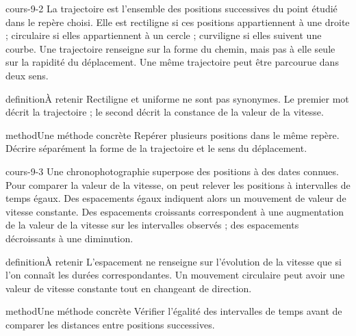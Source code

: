 \documentclass[12pt,twoside,openany]{book}
\begin{document}
\begin{pcFiche}{cours-9-2}
La trajectoire est l’ensemble des positions successives du point étudié dans le repère choisi. Elle est rectiligne si ces positions appartiennent à une droite ; circulaire si elles appartiennent à un cercle ; curviligne si elles suivent une courbe. Une trajectoire renseigne sur la forme du chemin, mais pas à elle seule sur la rapidité du déplacement. Une même trajectoire peut être parcourue dans deux sens.\par
{}
\begin{pcEncadre}{definition}{À retenir}
Rectiligne et uniforme ne sont pas synonymes. Le premier mot décrit la trajectoire ; le second décrit la constance de la valeur de la vitesse.\par
\end{pcEncadre}
\begin{pcEncadre}{method}{Une méthode concrète}
Repérer plusieurs positions dans le même repère. Décrire séparément la forme de la trajectoire et le sens du déplacement.\par
\end{pcEncadre}
\end{pcFiche}
\label{ch-9-cours-3}
\begin{pcFiche}{cours-9-3}
Une chronophotographie superpose des positions à des dates connues. Pour comparer la valeur de la vitesse, on peut relever les positions à intervalles de temps égaux. Des espacements égaux indiquent alors un mouvement de valeur de vitesse constante. Des espacements croissants correspondent à une augmentation de la valeur de la vitesse sur les intervalles observés ; des espacements décroissants à une diminution.\par
{}
\begin{pcEncadre}{definition}{À retenir}
L’espacement ne renseigne sur l’évolution de la vitesse que si l’on connaît les durées correspondantes. Un mouvement circulaire peut avoir une valeur de vitesse constante tout en changeant de direction.\par
\end{pcEncadre}
\begin{pcEncadre}{method}{Une méthode concrète}
Vérifier l’égalité des intervalles de temps avant de comparer les distances entre positions successives.\par
\end{pcEncadre}
\end{pcFiche}
\end{document}
